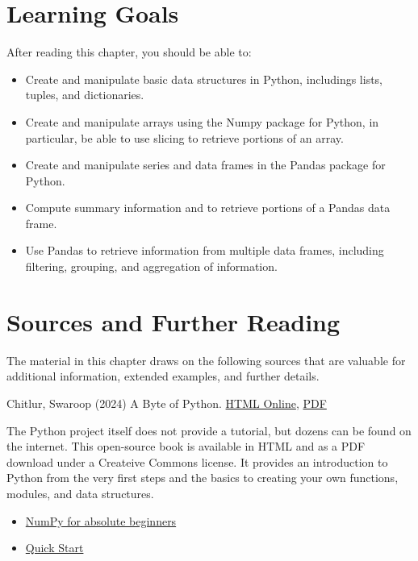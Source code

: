 %
%
\section*{Learning Goals}

After reading this chapter, you should be able to:
\begin{itemize}
   \item Create and manipulate basic data structures in Python, includings lists, tuples, and dictionaries.
   \item Create and manipulate arrays using the Numpy package for Python, in particular, be able to use slicing to retrieve portions of an array.
   \item Create and manipulate series and data frames in the Pandas package for Python.
   \item Compute summary information and to retrieve portions of a Pandas data frame.
   \item Use Pandas to retrieve information from multiple data frames, including filtering, grouping, and aggregation of information.
\end{itemize}

\section*{Sources and Further Reading}

The material in this chapter draws on the following sources that are valuable for additional information, extended examples, and further details.

\begin{resourcebox}
Chitlur, Swaroop (2024) A Byte of Python. \href{https://python.swaroopch.com/}{HTML Online}, \href{https://github.com/swaroopch/byte-of-python/releases/}{PDF} \\
\end{resourcebox}

The Python project itself does not provide a tutorial, but dozens can be found on the internet. This open-source book is available in HTML and as a PDF download under a Createive Commons license. It provides an introduction to Python from the very first steps and the basics to creating your own functions, modules, and data structures. 

\begin{resourcebox}
\begin{itemize}
\item \href{https://numpy.org/doc/stable/user/absolute_beginners.html}{NumPy for absolute beginners}
\item \href{https://numpy.org/doc/stable/user/quickstart.html}{Quick Start}
\end{itemize}
\end{resourcebox}

